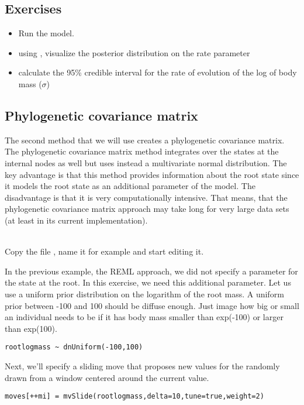 \subsection*{Exercises}

\begin{itemize}
\item
Run the model.
\item
using , visualize the posterior distribution on the rate parameter 
\item
calculate the 95\% credible interval for the rate of evolution of the log of body mass ($\sigma$)
\end{itemize}


\vspace{5cm}






\subsection{Phylogenetic covariance matrix}

The second method that we will use creates a phylogenetic covariance matrix. The phylogenetic covariance matrix method integrates over the states  at the internal nodes as well but uses instead a multivariate normal distribution.
The key advantage is that this method provides information about the root state since it models the root state as an additional parameter of the model. The disadvantage is that it is very computationally intensive. That means, that the phylogenetic covariance matrix approach may take long for very large data sets (at least in its current implementation).

\noindent \\ \impmark Copy the file , name it for example  and start editing it.

In the previous example, the REML approach, we did not specify a parameter for the state at the root.
In this exercise, we need this additional parameter.
Let us use a uniform prior distribution on the logarithm of the root mass.
A uniform prior between -100 and 100 should be diffuse enough. Just image how big or small an individual needs to be if it has body mass smaller than exp(-100) or larger than exp(100).
{\tt \small \begin{snugshade*}
\begin{lstlisting}
rootlogmass ~ dnUniform(-100,100)
\end{lstlisting}
\end{snugshade*}}
Next, we'll specify a sliding move that proposes new values for the  randomly drawn from a window centered around the current value.
{\tt \small \begin{snugshade*}
\begin{lstlisting}
moves[++mi] = mvSlide(rootlogmass,delta=10,tune=true,weight=2) 
\end{lstlisting}
\end{snugshade*}}

